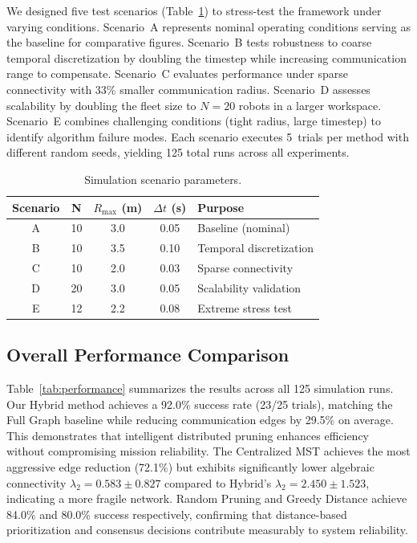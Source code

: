 We designed five test scenarios (Table~\ref{tab:scenarios}) to stress-test the framework under varying conditions. Scenario~A represents nominal operating conditions serving as the baseline for comparative figures. Scenario~B tests robustness to coarse temporal discretization by doubling the timestep while increasing communication range to compensate. Scenario~C evaluates performance under sparse connectivity with 33\% smaller communication radius. Scenario~D assesses scalability by doubling the fleet size to $N=20$ robots in a larger workspace. Scenario~E combines challenging conditions (tight radius, large timestep) to identify algorithm failure modes. Each scenario executes 5~trials per method with different random seeds, yielding 125 total runs across all experiments.

\begin{table}[t]
\centering
\caption{Simulation scenario parameters.}
\label{tab:scenarios}
\begin{tabular}{ccccp{}}
\hline
\textbf{Scenario} & \textbf{N} & \textbf{$R_{\max}$ (m)} & \textbf{$\Delta t$ (s)} & \textbf{Purpose} \\
\hline
A & 10 & 3.0 & 0.05 & Baseline (nominal) \\
B & 10 & 3.5 & 0.10 & Temporal discretization \\
C & 10 & 2.0 & 0.03 & Sparse connectivity \\
D & 20 & 3.0 & 0.05 & Scalability validation \\
E & 12 & 2.2 & 0.08 & Extreme stress test \\
\hline
\end{tabular}
\end{table}

\subsection{Overall Performance Comparison}

Table~\ref{tab:performance} summarizes the results across all 125 simulation runs. Our Hybrid method achieves a 92.0\% success rate (23/25 trials), matching the Full Graph baseline while reducing communication edges by 29.5\% on average. This demonstrates that intelligent distributed pruning enhances efficiency without compromising mission reliability. The Centralized MST achieves the most aggressive edge reduction (72.1\%) but exhibits significantly lower algebraic connectivity $\lambda_2 = 0.583 \pm 0.827$ compared to Hybrid's $\lambda_2 = 2.450 \pm 1.523$, indicating a more fragile network. Random Pruning and Greedy Distance achieve 84.0\% and 80.0\% success respectively, confirming that distance-based prioritization and consensus decisions contribute measurably to system reliability.

